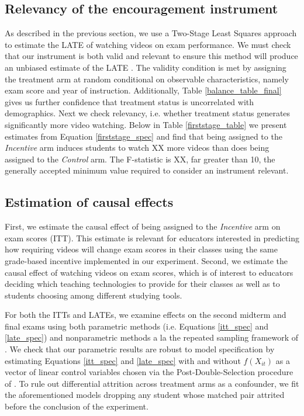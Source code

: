 \documentclass[12pt]{article}
\begin{document}
\subsection{Relevancy of the encouragement instrument}

As described in the previous section, we use a Two-Stage Least Squares approach to estimate the LATE of watching videos on exam performance. We must check that our instrument is both valid and relevant to ensure this method will produce an unbiased estimate of the LATE \parencite{ir2015}. The validity condition is met by assigning the treatment arm at random conditional on observable characteristics, namely exam score and year of instruction. Additionally, Table \ref{balance_table_final} gives us further confidence that treatment status is uncorrelated with demographics. Next we check relevancy, i.e. whether treatment status generates significantly more video watching. Below in Table \ref{firststage_table} we present estimates from Equation \ref{firststage_spec} and find that being assigned to the \textit{Incentive} arm induces students to watch XX more videos than does being assigned to the \textit{Control} arm. The F-statistic is XX, far greater than 10, the generally accepted minimum value required to consider an instrument relevant.

\subsection{Estimation of causal effects}

First, we estimate the causal effect of being assigned to the \textit{Incentive} arm on exam scores (ITT). This estimate is relevant for educators interested in predicting how requiring videos will change exam scores in their classes using the same grade-based incentive implemented in our experiment. Second, we estimate the causal effect of watching videos on exam scores, which is of interest to educators deciding which teaching technologies to provide for their classes as well as to students choosing among different studying tools.

For both the ITTs and LATEs, we examine effects on the second midterm and final exams using both parametric methods (i.e. Equations \ref{itt_spec} and \ref{late_spec}) and nonparametric methods a la the repeated sampling framework of \textcite{neyman1923}%
. We check that our parametric results are robust to model specification by estimating Equations \ref{itt_spec} and \ref{late_spec} with and without $f(X_{it})$ as a vector of linear control variables chosen via the Post-Double-Selection procedure of \textcite{bch2014a}. To rule out differential attrition across treatment arms as a confounder, we fit the aforementioned models dropping any student whose matched pair attrited before the conclusion of the experiment.
\end{document}

